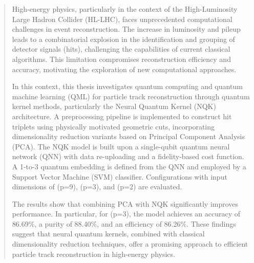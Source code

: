 \begin{abstract}

\noindent High-energy physics, particularly in the context of the High-Luminosity Large Hadron Collider (HL-LHC), faces unprecedented computational challenges in event reconstruction. The increase in luminosity and pileup leads to a combinatorial explosion in the identification and grouping of detector signals (hits), challenging the capabilities of current classical algorithms. This limitation compromises reconstruction efficiency and accuracy, motivating the exploration of new computational approaches.

In this context, this thesis investigates quantum computing and quantum machine learning (QML) for particle track reconstruction through quantum kernel methods, particularly the Neural Quantum Kernel (NQK) architecture. A preprocessing pipeline is implemented to construct hit triplets using physically motivated geometric cuts, incorporating dimensionality reduction variants based on Principal Component Analysis (PCA). The NQK model is built upon a single-qubit quantum neural network (QNN) with data re-uploading and a fidelity-based cost function. A 1-to-3 quantum embedding is defined from the QNN and employed by a Support Vector Machine (SVM) classifier. Configurations with input dimensions of (p=9), (p=3), and (p=2) are evaluated.

The results show that combining PCA with NQK significantly improves performance. In particular, for (p=3), the model achieves an accuracy of 86.69$\%$, a purity of 88.40$\%$, and an efficiency of 86.26$\%$. These findings suggest that neural quantum kernels, combined with classical dimensionality reduction techniques, offer a promising approach to efficient particle track reconstruction in high-energy physics.

\vspace{0.5cm}
\noindent {}
\end{abstract}

\newpage